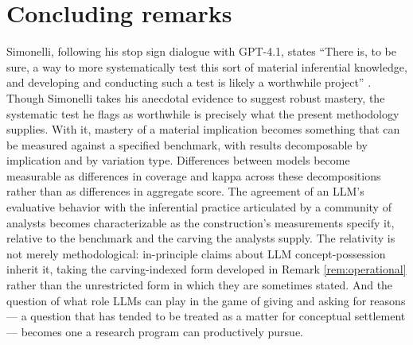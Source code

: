 \documentclass[11pt]{article}
\newtheorem{remark}{Remark}
\begin{document}

\section{Concluding remarks}

Simonelli, following his stop sign dialogue with GPT-4.1, states ``There is, to be sure, a way to more systematically test this sort of material inferential knowledge, and developing and conducting such a test is likely a worthwhile project'' \cite[p.~19]{simonelli2026}. Though Simonelli takes his anecdotal evidence to suggest robust mastery, the systematic test he flags as worthwhile is precisely what the present methodology supplies. With it, mastery of a material implication becomes something that can be measured against a specified benchmark, with results decomposable by implication and by variation type. Differences between models become measurable as differences in coverage and kappa across these decompositions rather than as differences in aggregate score. The agreement of an LLM's evaluative behavior with the inferential practice articulated by a community of analysts becomes characterizable as the construction's measurements specify it, relative to the benchmark and the carving the analysts supply. The relativity is not merely methodological: in-principle claims about LLM concept-possession inherit it, taking the carving-indexed form developed in Remark \ref{rem:operational} rather than the unrestricted form in which they are sometimes stated. And the question of what role LLMs can play in the game of giving and asking for reasons --- a question that has tended to be treated as a matter for conceptual settlement --- becomes one a research program can productively pursue.
\end{document}

